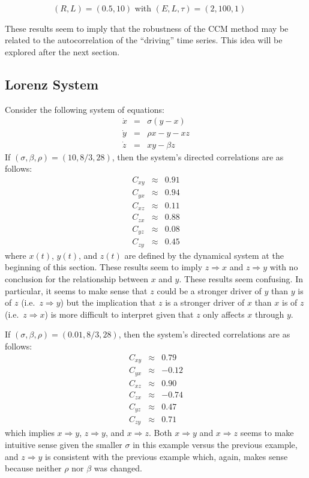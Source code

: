 \documentclass[a4paper,11pt]{article}
\begin{document}
\begin{figure}[h!t]
\begin{subfigure}[b]{0.4\textwidth}
\caption{$(R,L) = (0.5,10)$ with $\left(E,L,\tau\right)=\left(2,100,1\right)$}
\end{subfigure}
\caption{}
\end{figure}
 
These results seem to imply that the robustness of the CCM method may be related to the autocorrelation of the ``driving'' time series.  This idea will be explored after the next section.

\subsection{Lorenz System}
Consider the following system of equations:
\begin{eqnarray*}
\dot{x} &=& \sigma\left(y-x\right)\\
\dot{y} &=& \rho x-y-xz\\
\dot{z} &=& xy - \beta z
\end{eqnarray*}
If $(\sigma,\beta,\rho)=(10,8/3,28)$, then the system's directed correlations are as follows:
\begin{eqnarray*}
C_{xy} &\approx & 0.91\\
C_{yx} &\approx & 0.94\\
C_{xz} &\approx & 0.11\\
C_{zx} &\approx & 0.88\\
C_{yz} &\approx & 0.08\\
C_{zy} &\approx & 0.45
\end{eqnarray*}
where $x(t)$, $y(t)$, and $z(t)$ are defined by the dynamical system at the beginning of this section.  These results seem to imply $z\Rightarrow x$ and $z\Rightarrow y$ with no conclusion for the relationship between $x$ and $y$.  These results seem confusing.  In particular, it seems to make sense that $z$ could be a stronger driver of $y$ than $y$ is of $z$ (i.e.\ $z\Rightarrow y$) but the implication that $z$ is a stronger driver of $x$ than $x$ is of $z$ (i.e.\ $z\Rightarrow x$) is more difficult to interpret given that $z$ only affects $x$ through $y$.

If $(\sigma,\beta,\rho)=(0.01,8/3,28)$, then the system's directed correlations are as follows:
\begin{eqnarray*}
C_{xy} &\approx & 0.79\\
C_{yx} &\approx & -0.12\\
C_{xz} &\approx & 0.90\\
C_{zx} &\approx & -0.74\\
C_{yz} &\approx & 0.47\\
C_{zy} &\approx & 0.71
\end{eqnarray*}
which implies $x\Rightarrow y$, $z\Rightarrow y$, and $x\Rightarrow z$.  Both $x\Rightarrow y$ and $x\Rightarrow z$ seems to make intuitive sense given the smaller $\sigma$ in this example versus the previous example, and $z\Rightarrow y$ is consistent with the previous example which, again, makes sense because neither $\rho$ nor $\beta$ was changed.
\end{document}
